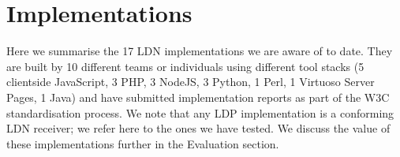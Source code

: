 \documentclass[a4paper]{llncs}
\begin{document}
                        \section{Implementations}
  \label{implementations}



\par Here we summarise the 17 LDN implementations we are aware of to date. They are built by 10 different teams or individuals using different tool stacks (5 clientside JavaScript, 3 PHP, 3 NodeJS, 3 Python, 1 Perl, 1 Virtuoso Server Pages, 1 Java) and have submitted \empty implementation reports as part of the W3C standardisation process. We note that any \empty LDP implementation is a conforming LDN receiver; we refer here to the ones we have tested. We discuss the value of these implementations further in the \empty Evaluation section.
\end{document}
